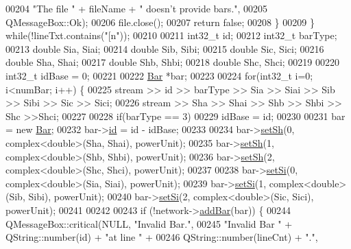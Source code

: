 \begin{DoxyCode}
00204                             \textcolor{stringliteral}{"The file "} + fileName + \textcolor{stringliteral}{" doesn't provide bars."},
00205                             QMessageBox::Ok);
00206       file.close();
00207       \textcolor{keywordflow}{return} \textcolor{keyword}{false};
00208     \}
00209   \} \textcolor{keywordflow}{while}(!lineTxt.contains(\textcolor{stringliteral}{"[n"}));
00210 
00211   int32\_t id;
00212   int32\_t barType;
00213   \textcolor{keywordtype}{double} Sia, Siai;
00214   \textcolor{keywordtype}{double} Sib, Sibi;
00215   \textcolor{keywordtype}{double} Sic, Sici;
00216   \textcolor{keywordtype}{double} Sha, Shai;
00217   \textcolor{keywordtype}{double} Shb, Shbi;
00218   \textcolor{keywordtype}{double} Shc, Shci;
00219 
00220   int32\_t idBase = 0;
00221 
00222   \hyperlink{class_bar}{Bar} *bar;
00223 
00224   \textcolor{keywordflow}{for}(int32\_t i=0; i<numBar; i++) \{
00225     stream >> \textcolor{keywordtype}{id} >> barType >> Sia >> Siai >> Sib >> Sibi >> Sic >> Sici;
00226     stream >> Sha >> Shai >> Shb >> Shbi >> Shc >>Shci;
00227 
00228     \textcolor{keywordflow}{if}(barType == 3)
00229       idBase = id;
00230 
00231     bar = \textcolor{keyword}{new} \hyperlink{class_bar}{Bar};
00232     bar->\hyperlink{class_bar_a9dc5c6a6d44fe412ae34ef8a881b8dce}{id} = \textcolor{keywordtype}{id} - idBase;
00233 
00234     bar->\hyperlink{group___models_ga207abd3d0649a488e3c44cf2a501ed23}{setSh}(0, complex<double>(Sha, Shai), powerUnit);
00235     bar->\hyperlink{group___models_ga207abd3d0649a488e3c44cf2a501ed23}{setSh}(1, complex<double>(Shb, Shbi), powerUnit);
00236     bar->\hyperlink{group___models_ga207abd3d0649a488e3c44cf2a501ed23}{setSh}(2, complex<double>(Shc, Shci), powerUnit);
00237 
00238     bar->\hyperlink{group___models_ga74e510be49e50e4c14550b32e1dc92f9}{setSi}(0, complex<double>(Sia, Siai), powerUnit);
00239     bar->\hyperlink{group___models_ga74e510be49e50e4c14550b32e1dc92f9}{setSi}(1, complex<double>(Sib, Sibi), powerUnit);
00240     bar->\hyperlink{group___models_ga74e510be49e50e4c14550b32e1dc92f9}{setSi}(2, complex<double>(Sic, Sici), powerUnit);
00241 
00242 
00243     \textcolor{keywordflow}{if} (!network->\hyperlink{group___graphics_ga8c5dfef0216731246f7411e1a5fbee01}{addBar}(bar)) \{
00244       QMessageBox::critical(NULL, \textcolor{stringliteral}{"Invalid Bar."},
00245                             \textcolor{stringliteral}{"Invalid Bar "} + QString::number(\textcolor{keywordtype}{id}) + \textcolor{stringliteral}{"at line "} +
00246                             QString::number(lineCnt) + \textcolor{stringliteral}{"."},

\end{DoxyCode}
